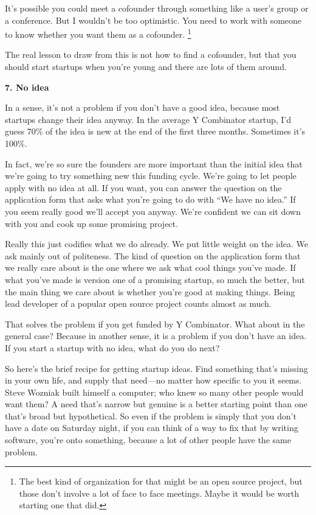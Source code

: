 \documentclass[12pt]{book}
\begin{document}
It's possible you could meet a cofounder through something like a user's
group or a conference. But I wouldn't be too optimistic. You need to
work with someone to know whether you want them as a cofounder.
\footnote{The best kind of organization for that might be an open source
project, but those don't involve a lot of face to face meetings. Maybe
it would be worth starting one that did.}

The real lesson to draw from this is not how to find a cofounder, but
that you should start startups when you're young and there are lots of
them around.

\textbf{7. No idea}

In a sense, it's not a problem if you don't have a good idea, because
most startups change their idea anyway. In the average Y Combinator
startup, I'd guess 70\% of the idea is new at the end of the first three
months. Sometimes it's 100\%.

In fact, we're so sure the founders are more important than the initial
idea that we're going to try something new this funding cycle. We're
going to let people apply with no idea at all. If you want, you can
answer the question on the application form that asks what you're going
to do with ``We have no idea.'' If you seem really good we'll accept you
anyway. We're confident we can sit down with you and cook up some
promising project.

Really this just codifies what we do already. We put little weight on
the idea. We ask mainly out of politeness. The kind of question on the
application form that we really care about is the one where we ask what
cool things you've made. If what you've made is version one of a
promising startup, so much the better, but the main thing we care about
is whether you're good at making things. Being lead developer of a
popular open source project counts almost as much.

That solves the problem if you get funded by Y Combinator. What about in
the general case? Because in another sense, it is a problem if you don't
have an idea. If you start a startup with no idea, what do you do next?

So here's the brief recipe for getting startup ideas. Find something
that's missing in your own life, and supply that need---no matter how
specific to you it seems. Steve Wozniak built himself a computer; who
knew so many other people would want them? A need that's narrow but
genuine is a better starting point than one that's broad but
hypothetical. So even if the problem is simply that you don't have a
date on Saturday night, if you can think of a way to fix that by writing
software, you're onto something, because a lot of other people have the
same problem.
\end{document}

